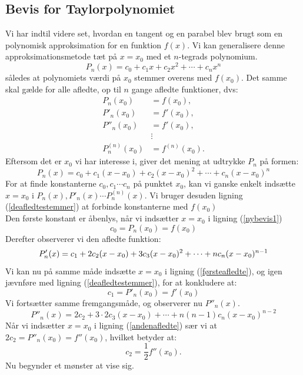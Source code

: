 \documentclass[12pt, a4paper]{article}
\begin{document}
\begin{refsection}
\subsection{Bevis for Taylorpolynomiet}
Vi har indtil videre set, hvordan en tangent og en parabel blev brugt som en polynomisk approksimation for en funktion $f(x)$. Vi kan generalisere denne approksimationsmetode tæt på $x=x_0$ med et  $n$-tegrads polynomium.\\
\[
P_n(x)=c_0+c_1x+c_2x^2+ \cdots +c_nx^n
\] 
således at polynomiets værdi på $x_0$ stemmer overens med  $f(x_0)$. Det samme skal gælde for alle afledte, op til $n$ gange afledte funktioner, dvs:
 \begin{equation}\label{deafledtestemmer}
     \begin{aligned}
         P_n(x_0)&=f(x_0),\\
         P'_n(x_0)&=f'(x_0),\\
         P''_n(x_0)&=f'(x_0),\\
                   &\vdots\\
         P^{(n)}_n(x_0)&=f^{(n)}(x_0).
     \end{aligned}
\end{equation}
Eftersom det er $x_0$ vi har interesse i, giver det mening at udtrykke  $P_n$ på formen:
\begin{equation}\label{nybevis1}
   P_n(x)=c_0+c_1(x-x_0)+c_2(x-x_0)^2+\cdots+c_n(x-x_0)^n 
\end{equation}
For at finde konstanterne $c_0, c_1 \cdots c_n$ på punktet $x_0$, kan vi ganske enkelt indsætte $x=x_0$ i $P_n(x), P'_n(x) \cdots P^{(n)}_n(x)$. Vi bruger desuden ligning (\ref{deafledtestemmer}) at forbinde konstanterne med $f(x_0)$\\
Den første konstant er åbenlys, når vi indsætter $x=x_0$ i ligning (\ref{nybevis1})
 \begin{equation*}
    c_0=P_n(x_0)=f(x_0)
\end{equation*}
Derefter observerer vi den afledte funktion: 
\begin{equation}\label{førsteafledte}
        P'_n(x)=c_1+2c_2(x-x_0)+3c_3(x-x_0)^2+\cdots+nc_n(x-x_0)^{n-1}\\
\end{equation}
Vi kan nu på samme måde indsætte $x=x_0$ i ligning (\ref{førsteafledte}), og igen jævnføre med ligning (\ref{deafledtestemmer}), for at konkludere at:
\begin{equation*}
    c_1=P'_n(x_0)=f'(x_0)
\end{equation*}
Vi fortsætter samme fremgangsmåde, og observerer nu $P''_n(x)$.
\begin{equation}\label{andenafledte}
    P''_n(x)=2c_2+ 3\cdot2c_3(x-x_0)+\cdots+n(n-1)c_n(x-x_0)^{n-2}
\end{equation}
Når vi indsætter $x=x_0$ i ligning (\ref{andenafledte}) sær vi at $2c_2 = P''_n(x_0)=f''(x_0)$, hvilket betyder at:
\begin{equation*}
    c_2=\frac{1}{2}f''(x_0).
\end{equation*}
Nu begynder et mønster at vise sig.



\end{refsection}
\end{document}
